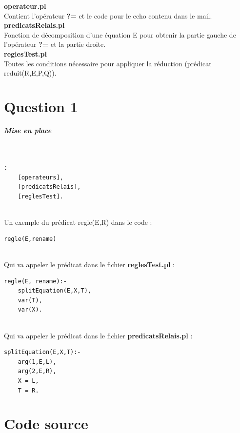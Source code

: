 \documentclass[10pt,a4paper]{report}
\begin{document}
\begin{center}
\textbf{operateur.pl}\\
Contient l'opérateur \textbf{?=} et le code pour le echo contenu dans le mail.\\[1cm]
\textbf{predicatsRelais.pl}\\
Fonction de décomposition d'une équation E pour obtenir la partie gauche de
l'opérateur \textbf{?=} et la partie droite.\\[1cm]
\textbf{reglesTest.pl}\\
Toutes les conditions nécessaire pour appliquer la réduction (prédicat reduit(R,E,P,Q)).\\[1cm]
\end{center}





\chapter*{Question 1}
\paragraph{Mise en place} ~\\
\begin{lstlisting}[caption ={Dans le fichier $main.pl$}]
:-
	[operateurs],
	[predicatsRelais],
	[reglesTest].
\end{lstlisting} ~\\
Un exemple du prédicat regle(E,R) dans le code :
\begin{lstlisting}[caption ={Dans le fichier $main.pl$}]
regle(E,rename)
\end{lstlisting}~\\
Qui va appeler le prédicat dans le fichier \textbf{reglesTest.pl} :
\begin{lstlisting}[caption ={Dans le fichier $reglesTest.pl$}]
regle(E, rename):-
	splitEquation(E,X,T),
	var(T),
	var(X).
\end{lstlisting}~\\
Qui va appeler le prédicat dans le fichier \textbf{predicatsRelais.pl} :
\begin{lstlisting}[caption ={Dans le fichier $predicatsRelais.pl$}]
splitEquation(E,X,T):-
	arg(1,E,L),
	arg(2,E,R),
	X = L,
	T = R.
\end{lstlisting}



\mbox{}
\newpage
\chapter*{Code source}
\end{document}
